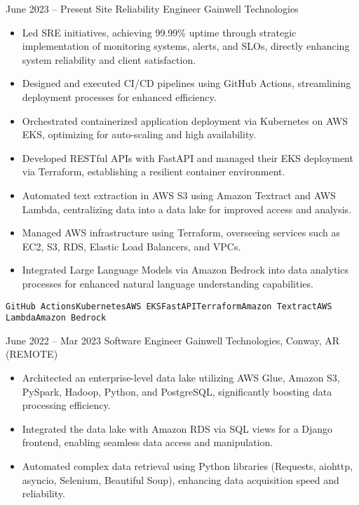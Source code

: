 \documentclass[9pt]{developercv} %
\begin{document}
\begin{entrylist}
    \entry
        { June 2023 -- Present}
        { Site Reliability Engineer }
        { Gainwell Technologies }
        {
        \begin{itemize}
            \item Led SRE initiatives, achieving 99.99\% uptime through strategic implementation of monitoring systems, alerts, and SLOs, directly enhancing system reliability and client satisfaction.
            \item Designed and executed CI/CD pipelines using GitHub Actions, streamlining deployment processes for enhanced efficiency.
            \item Orchestrated containerized application deployment via Kubernetes on AWS EKS, optimizing for auto-scaling and high availability.
            \item Developed RESTful APIs with FastAPI and managed their EKS deployment via Terraform, establishing a resilient container environment.
            \item Automated text extraction in AWS S3 using Amazon Textract and AWS Lambda, centralizing data into a data lake for improved access and analysis.
            \item Managed AWS infrastructure using Terraform, overseeing services such as EC2, S3, RDS, Elastic Load Balancers, and VPCs.
            \item Integrated Large Language Models via Amazon Bedrock into data analytics processes for enhanced natural language understanding capabilities.
        \end{itemize}
        \texttt{GitHub Actions}\slashsep\texttt{Kubernetes}\slashsep\texttt{AWS EKS}\slashsep\texttt{FastAPI}\slashsep\texttt{Terraform}\slashsep\texttt{Amazon Textract}\slashsep\texttt{AWS Lambda}\slashsep\texttt{Amazon Bedrock}
        }
    \entry
        { June 2022 -- Mar 2023}
        { Software Engineer}
        { Gainwell Technologies, Conway, AR (REMOTE)}
        {
        \begin{itemize}
            \item Architected an enterprise-level data lake utilizing AWS Glue, Amazon S3, PySpark, Hadoop, Python, and PostgreSQL, significantly boosting data processing efficiency.
            \item Integrated the data lake with Amazon RDS via SQL views for a Django frontend, enabling seamless data access and manipulation.
            \item Automated complex data retrieval using Python libraries (Requests, aiohttp, asyncio, Selenium, Beautiful Soup), enhancing data acquisition speed and reliability.

\end{itemize}}
\end{entrylist}
\end{document}
